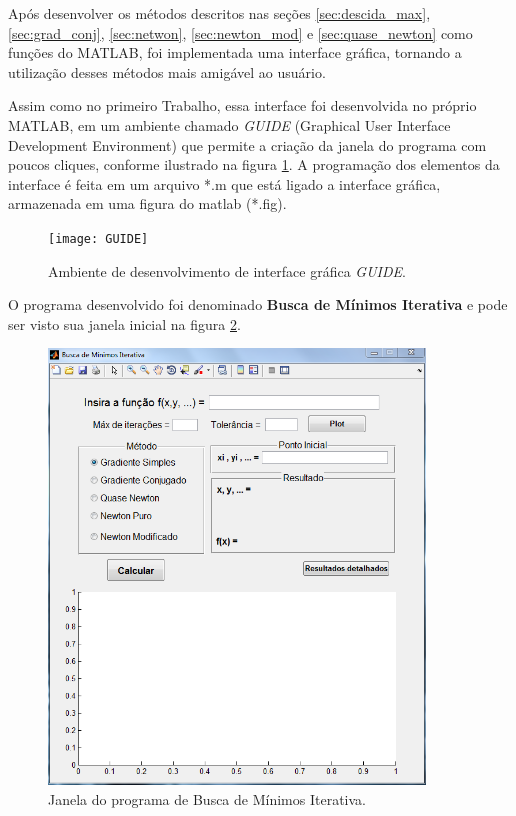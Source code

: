 Após desenvolver os métodos descritos nas seções \ref{sec:descida_max}, \ref{sec:grad_conj}, \ref{sec:netwon}, \ref{sec:newton_mod} e \ref{sec:quase_newton} como funções do MATLAB, foi implementada uma interface gráfica, tornando a utilização desses métodos mais amigável ao usuário.\\

\par Assim como no primeiro Trabalho, essa interface foi desenvolvida no próprio MATLAB, em um ambiente chamado \textit{GUIDE} (Graphical User Interface Development Environment) que permite a criação da janela do programa com poucos cliques, conforme ilustrado na figura \ref{fig:guide}. A programação dos elementos da interface é feita em um arquivo *.m que está ligado a interface gráfica, armazenada em uma figura do matlab (*.fig).

\begin{figure}[H]
	\begin{center}
		\texttt{[image: GUIDE]}   
		\caption{Ambiente de desenvolvimento de interface gráfica \textit{GUIDE}.}
		\label{fig:guide}
	\end{center}
\end{figure}

O programa desenvolvido foi denominado \textbf{Busca de Mínimos Iterativa} e pode ser visto sua janela inicial na figura \ref{fig:gui}.

\begin{figure}[H]
	\begin{center}
		\includegraphics[width=10cm]{GUI}   
		\caption{Janela do programa de Busca de Mínimos Iterativa.}
		\label{fig:gui}
	\end{center}
\end{figure}

